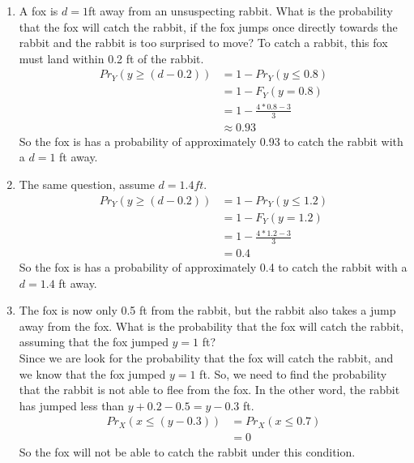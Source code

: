 \documentclass[preprint,12pt]{elsarticle}
\begin{document}
\begin{enumerate}
        \item A fox is $d=1$ft away from an unsuspecting rabbit. What is the
        probability that the fox will catch the rabbit, if the fox jumps once
        directly towards the rabbit and the rabbit is too surprised to move?
        To catch a rabbit, this fox must land within 0.2 ft of the rabbit.
        \begin{align*}
            Pr_Y(y\geq (d-0.2)) &= 1 - Pr_Y(y\leq 0.8) \\
                                &= 1 - F_Y(y=0.8) \\
                                &= 1 - \frac{4*0.8-3}{3} \\
                                &\approx 0.93
        \end{align*}
        So the fox is has a probability of approximately 0.93 to catch the 
        rabbit with a $d=1$ ft away.

        \item The same question, assume $d=1.4ft$.
        \begin{align*}
            Pr_Y(y\geq (d-0.2)) &= 1 - Pr_Y(y\leq 1.2) \\
                                &= 1 - F_Y(y=1.2) \\
                                &= 1 - \frac{4*1.2-3}{3} \\
                                &= 0.4
        \end{align*}
        So the fox is has a probability of approximately 0.4 to catch the 
        rabbit with a $d=1.4$ ft away.

        \item The fox is now only 0.5 ft from the rabbit, but the rabbit also 
        takes a jump away from the fox. What is the probability that the fox 
        will catch the rabbit, assuming that the fox jumped $y = 1$ ft?\\

        Since we are look for the probability that the fox will catch the rabbit,
        and we know that the fox jumped $y=1$ ft. So, we need to find the
        probability that the rabbit is not able to flee from the fox. In the 
        other word, the rabbit has jumped less than $y+0.2-0.5=y-0.3$ ft.
        \begin{align*}
            Pr_X(x\leq (y-0.3)) &= Pr_X(x\leq 0.7) \\
                                &= 0
        \end{align*}
        So the fox will not be able to catch the rabbit under this condition.


\end{enumerate}
\end{document}
